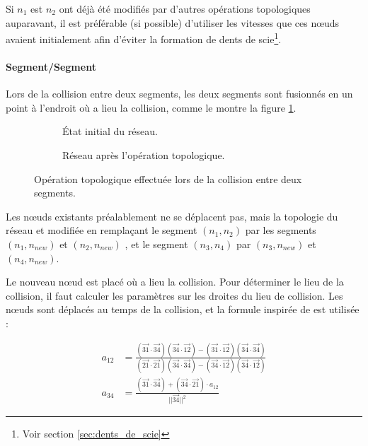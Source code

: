 \documentclass[11pt,class=article,float=false,crop=false]{standalone}
\begin{document}
Si $n_1$ est $n_2$ ont déjà été modifiés par d'autres opérations topologiques auparavant, il est préférable (si possible) d'utiliser les vitesses que ces nœuds avaient initialement afin d'éviter la formation de dents de scie\footnote{Voir section \ref{sec:dents_de_scie}}.

\paragraph{Segment/Segment}

Lors de la collision entre deux segments, les deux segments sont fusionnés en un point à l'endroit où a lieu la collision, comme le montre la figure \ref{fig:topo_nomove_segseg}.

\begin{figure}[h]
	\centering
	\begin{subfigure}[b]{0.5\textwidth}
		\centering
		\caption{État initial du réseau.}
	\end{subfigure}%
	\begin{subfigure}[b]{0.5\textwidth}
		\centering
		\caption{Réseau après l'opération topologique.}
	\end{subfigure}
	\caption{Opération topologique effectuée lors de la collision entre deux segments.}
	\label{fig:topo_nomove_segseg}
\end{figure}

Les nœuds existants préalablement ne se déplacent pas, mais la  topologie du réseau et modifiée en remplaçant le segment $(n_1,n_2)$ par les segments $(n_1,n_{new})$ et $(n_2,n_{new})$ , et le segment $(n_3,n_4)$ par $(n_3,n_{new})$ et $(n_4,n_{new})$.

Le nouveau nœud est placé où a lieu la collision. Pour déterminer le lieu de la collision, il faut calculer les paramètres sur les droites du lieu de collision. Les nœuds sont déplacés au temps de la collision, et la formule inspirée de  est utilisée :

\begin{equation}
\begin{split}
a_{12} &= \frac{ (\vec{31} \cdot \vec{34})(\vec{34} \cdot \vec{12}) - (\vec{31} \cdot \vec{12})(\vec{34} \cdot \vec{34}) }
{ (\vec{21} \cdot \vec{21})(\vec{34} \cdot \vec{34}) - (\vec{34} \cdot \vec{12})(\vec{34} \cdot \vec{12}) } \\
a_{34} &= \frac{ (\vec{31} \cdot \vec{34}) + (\vec{34} \cdot \vec{21}) \cdot a_{12} }{||\vec{34}||^2}
\end{split}
\end{equation}
\end{document}
